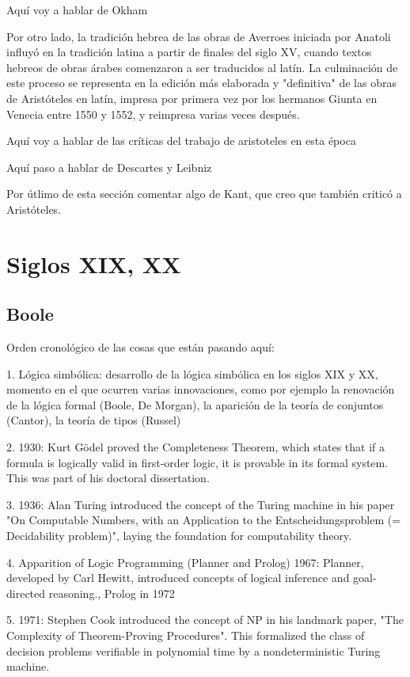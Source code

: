 \documentclass{article}
\begin{document}
Aquí voy a hablar de Okham

Por otro lado, la tradición hebrea de las obras de Averroes iniciada por Anatoli influyó en la tradición latina a partir de finales del siglo XV, cuando textos hebreos de obras árabes comenzaron a ser traducidos al latín. La culminación de este proceso se representa en la edición más elaborada y "definitiva" de las obras de Aristóteles en latín, impresa por primera vez por los hermanos Giunta en Venecia entre 1550 y 1552, y reimpresa varias veces después\cite{charles2004latin}.

Aquí voy a hablar de las críticas del trabajo de aristoteles en esta época

Aquí paso a hablar de Descartes y Leibniz

Por útlimo de esta sección comentar algo de Kant, que creo que también criticó a Aristóteles.

\section{Siglos XIX, XX}

\subsection{Boole}

Orden cronológico de las cosas que están pasando aquí:

1. Lógica simbólica: desarrollo de la
lógica simbólica en los siglos XIX y XX, momento en el que ocurren varias
innovaciones, como por ejemplo la renovación de la lógica formal (Boole, De
Morgan), la aparición de la teoría de conjuntos (Cantor), la teoría de tipos
(Russel)

2. 1930: Kurt Gödel proved the Completeness Theorem, which states that if a formula is logically valid in first-order logic, it is provable in its formal system. This was part of his doctoral dissertation.

3. 1936: Alan Turing introduced the concept of the Turing machine in his paper "On Computable Numbers, with an Application to the Entscheidungsproblem (= Decidability problem)", laying the foundation for computability theory.

4. Apparition of Logic Programming (Planner and Prolog) 
1967: Planner, developed by Carl Hewitt, introduced concepts of logical inference and goal-directed reasoning., Prolog in 1972

5. 1971: Stephen Cook introduced the concept of NP in his landmark paper, "The Complexity of Theorem-Proving Procedures". This formalized the class of decision problems verifiable in polynomial time by a nondeterministic Turing machine.
\end{document}
